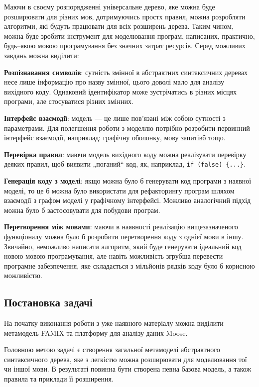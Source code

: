 \documentclass[12pt,a4paper]{article}
\begin{document}
Маючи в своєму розпорядженні універсальне дерево, яке можна буде розширювати для різних мов, дотримуючись простх правил, можна розробляти алгоритми, які будуть працювати для всіх розширень дерева. Таким чином, можна буде зробити інструмент для моделювання програм, написаних, практично, будь--якою мовою програмування без значних затрат ресурсів. Серед можливих завдань можна виділити:

\textbf{Розпізнавання символів}: сутність змінної в абстрактних синтаксичних деревах несе лише інформацію про назву змінної, цього доволі мало для аналізу вихідного коду. Однаковий ідентифікатор може зустрічатись в різних місцях програми, але стосуватися різних змінних.

\textbf{Інтерфейс взаємодії}: модель --- це лише пов'язані між собою сутності з параметрами. Для полегшення роботи з моделлю потрібно розробити первинний інтерфейс взаємодії, наприклад: графічну оболонку, мову запитівб тощо.

\textbf{Перевірка правил}: маючи модель вихідного коду можна реалізувати перевірку деяких правил, щоб виявити „поганий“ код, як, наприклад, \lstinline$if (false) {...}$.

\textbf{Генерація коду з моделі}: якщо можна було б генерувати код програми з наявної моделі, то це б можна було використати для рефакторингу програм шляхом взаємодії з графом моделі у графічному інтерфейсі. Можливо аналогічний підхід можна було б застосовувати для побудови програм.

\textbf{Перетворення між мовами}: маючи в наявності реалізацію вищезазначеного функціоналу можна було б розробити перетворення коду з однієї мови в іншу. Звичайно, неможливо написати алгоритм, який буде генерувати ідеальний код новою мовою програмування, але навіть можливість згрубша перевести програмне забезпечення, яке складається з мільйонів рядків коду було б корисною можливістю.

\subsection{Постановка задачі}
На початку виконання роботи з уже наявного матеріалу можна виділити метамодель FAMIX та платформу для аналізу даних Moose. 

Головною метою задачі є створення загальної метамоделі абстрактного синтаксичного дерева, яке з легкістю можна розширювати для моделювання тої чи іншої мови. В результаті повинна бути створена певна базова модель, а також правила та приклади її розширення.
\end{document}
